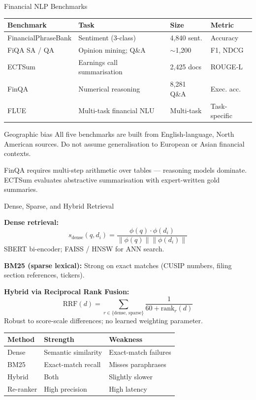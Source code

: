 \documentclass[9pt,t]{beamer}
\begin{document}
\begin{frame}[noframenumbering]{Financial NLP Benchmarks}

\small
\begin{tabular}{llll}
\toprule
\textbf{Benchmark} & \textbf{Task} & \textbf{Size} & \textbf{Metric} \\
\midrule
FinancialPhraseBank & Sentiment (3-class)       & 4,840 sent.  & Accuracy \\
FiQA SA / QA        & Opinion mining; Q\&A      & $\sim$1,200  & F1, NDCG \\
ECTSum              & Earnings call summarisation & 2,425 docs  & ROUGE-L \\
FinQA               & Numerical reasoning       & 8,281 Q\&A   & Exec. acc. \\
FLUE                & Multi-task financial NLU  & Multi-task   & Task-specific \\
\bottomrule
\end{tabular}

\normalsize
\medskip
\begin{alertblock}{Geographic bias}
All five benchmarks are built from English-language, North American sources.
Do not assume generalisation to European or Asian financial contexts.
\end{alertblock}

\medskip
FinQA requires multi-step arithmetic over tables --- reasoning models dominate.\\
ECTSum evaluates abstractive summarisation with expert-written gold summaries.
\end{frame}

\begin{frame}[noframenumbering]{Dense, Sparse, and Hybrid Retrieval}

\textbf{Dense retrieval:}
\[
s_{\text{dense}}(q, d_i) = \frac{\phi(q)\cdot\phi(d_i)}{\|\phi(q)\|\|\phi(d_i)\|}
\]
SBERT bi-encoder; FAISS / HNSW for ANN search.

\medskip
\textbf{BM25 (sparse lexical):}
Strong on exact matches (CUSIP numbers, filing section references, tickers).

\medskip
\textbf{Hybrid via Reciprocal Rank Fusion:}
\[
\text{RRF}(d) = \sum_{r \in \{\text{dense},\,\text{sparse}\}}
\frac{1}{60 + \text{rank}_r(d)}
\]
Robust to score-scale differences; no learned weighting parameter.

\medskip
\begin{tabular}{lll}
\toprule
\textbf{Method} & \textbf{Strength} & \textbf{Weakness} \\
\midrule
Dense   & Semantic similarity & Exact-match failures \\
BM25    & Exact-match recall  & Misses paraphrases \\
Hybrid  & Both               & Slightly slower \\
\midrule
Re-ranker & High precision    & High latency \\
\bottomrule
\end{tabular}
\end{frame}
\end{document}

